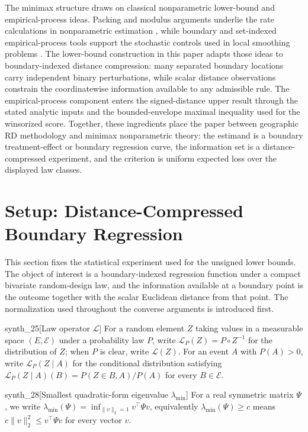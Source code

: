 \documentclass[11pt]{article}
\begin{document}
The minimax structure draws on classical nonparametric lower-bound and empirical-process ideas. Packing and modulus arguments underlie the rate calculations in nonparametric estimation \citep{Stone1982,Tsybakov2009}, while boundary and set-indexed empirical-process tools support the stochastic controls used in local smoothing problems \citep{Mammen1995,Cuevas2004,Vapnik1971,Pollard1984,VanderVaart1996}. The lower-bound construction in this paper adapts those ideas to boundary-indexed distance compression: many separated boundary locations carry independent binary perturbations, while scalar distance observations constrain the coordinatewise information available to any admissible rule. The empirical-process component enters the signed-distance upper result through the stated analytic inputs and the bounded-envelope maximal inequality used for the winsorized score. Together, these ingredients place the paper between geographic RD methodology and minimax nonparametric theory: the estimand is a boundary treatment-effect or boundary regression curve, the information set is a distance-compressed experiment, and the criterion is uniform expected loss over the displayed law classes.


\section{Setup: Distance-Compressed Boundary Regression}
\label{sec:unsigned-setup}

This section fixes the statistical experiment used for the unsigned lower bounds. The object of interest is a boundary-indexed regression function under a compact bivariate random-design law, and the information available at a boundary point is the outcome together with the scalar Euclidean distance from that point. The normalization used throughout the converse arguments is introduced first.

\begin{definitionv}{synth_25}[Law operator $\mathcal L$]
For a random element \(Z\) taking values in a measurable space \((E,\mathcal E)\) under a probability law \(P\), write \(\mathcal L_P(Z)=P\circ Z^{-1}\) for the distribution of \(Z\); when \(P\) is clear, write \(\mathcal L(Z)\). For an event \(A\) with \(P(A)>0\), write \(\mathcal L_P(Z\mid A)\) for the conditional distribution satisfying \(\mathcal L_P(Z\mid A)(B)=P(Z\in B,A)/P(A)\) for every \(B\in\mathcal E\).
\end{definitionv}

\begin{definitionv}{synth_28}[Smallest quadratic-form eigenvalue $\lambda_{\min}$]
For a real symmetric matrix $\Psi$, we write $\lambda_{\min}(\Psi)=\inf_{\|v\|_2=1} v^\top\Psi v$, equivalently $\lambda_{\min}(\Psi)\ge c$ means $c\|v\|_2^2\le v^\top\Psi v$ for every vector $v$.
\end{definitionv}
\end{document}
